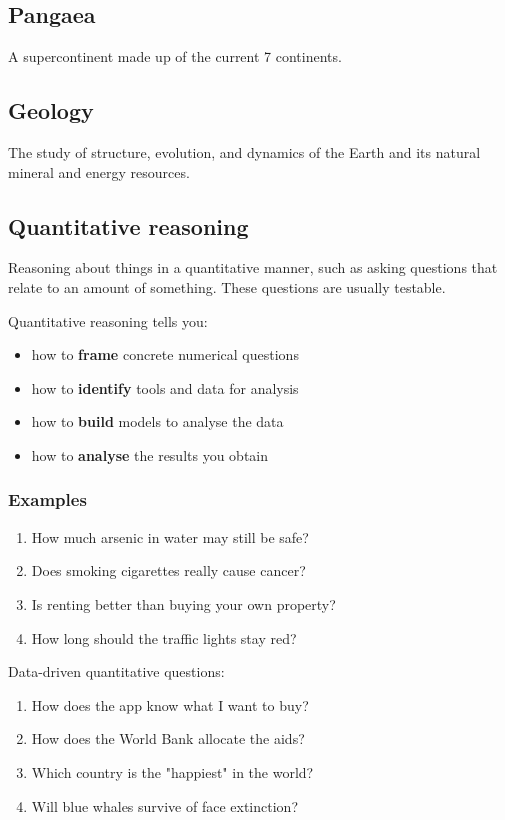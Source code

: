 \documentclass[11pt]{article}
\begin{document}
\subsection{Pangaea}
\label{sec:orgac9c88c}
A supercontinent made up of the current 7 continents.
\subsection{Geology}
\label{sec:org1a3c499}
The study of structure, evolution, and dynamics of the Earth and its natural mineral and energy resources.
\subsection{Quantitative reasoning}
\label{sec:org8659b44}
Reasoning about things in a quantitative manner, such as asking questions that relate to an amount of something. These questions are usually testable.

Quantitative reasoning tells you:
\begin{itemize}
\item how to \textbf{frame} concrete numerical questions
\item how to \textbf{identify} tools and data for analysis
\item how to \textbf{build} models to analyse the data
\item how to \textbf{analyse} the results you obtain
\end{itemize}
\subsubsection{Examples}
\label{sec:orgd25817d}
\begin{enumerate}
\item How much arsenic in water may still be safe?
\item Does smoking cigarettes really cause cancer?
\item Is renting better than buying your own property?
\item How long should the traffic lights stay red?
\end{enumerate}

Data-driven quantitative questions:
\begin{enumerate}
\item How does the app know what I want to buy?
\item How does the World Bank allocate the aids?
\item Which country is the "happiest" in the world?
\item Will blue whales survive of face extinction?
\end{enumerate}
\end{document}
